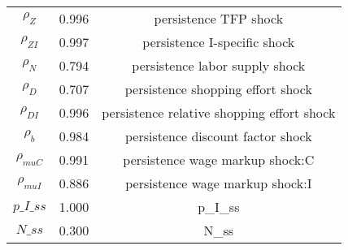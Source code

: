 \begin{center}
\begin{longtable}{ccc}
${\rho_Z}$ 	 & 	 0.996 	 & 	 persistence TFP shock\\
${\rho_{ZI}}$ 	 & 	 0.997 	 & 	 persistence I-specific shock\\
${\rho_N}$ 	 & 	 0.794 	 & 	 persistence labor supply shock\\
${\rho_D}$ 	 & 	 0.707 	 & 	 persistence shopping effort shock\\
${\rho_{DI}}$ 	 & 	 0.996 	 & 	 persistence relative shopping effort shock\\
${\rho_b}$ 	 & 	 0.984 	 & 	 persistence discount factor shock\\
${\rho_{muC}}$ 	 & 	 0.991 	 & 	 persistence wage markup shock:C\\
${\rho_{muI}}$ 	 & 	 0.886 	 & 	 persistence wage markup shock:I\\
$p\_I\_ss$ 	 & 	 1.000 	 & 	 p\_I\_ss\\
$N\_ss$ 	 & 	 0.300 	 & 	 N\_ss\\
\bottomrule%
\end{longtable}
\end{center}
